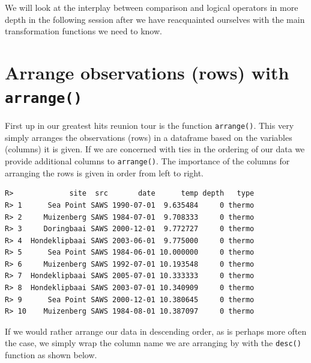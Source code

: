 \documentclass[]{book}
\newenvironment{Shaded}{\begin{snugshade}}{\end{snugshade}}
\newcommand{\KeywordTok}[1]{\textcolor[rgb]{0.13,0.29,0.53}{\textbf{#1}}}
\newcommand{\StringTok}[1]{\textcolor[rgb]{0.31,0.60,0.02}{#1}}
\newcommand{\OperatorTok}[1]{\textcolor[rgb]{0.81,0.36,0.00}{\textbf{#1}}}
\newcommand{\NormalTok}[1]{#1}
\theoremstyle{definition}
\theoremstyle{definition}
\theoremstyle{definition}
\theoremstyle{remark}
\begin{document}
We will look at the interplay between comparison and logical operators
in more depth in the following session after we have reacquainted
ourselves with the main transformation functions we need to know.

\section{\texorpdfstring{Arrange observations (rows) with
\texttt{arrange()}}{Arrange observations (rows) with arrange()}}\label{arrange-observations-rows-with-arrange}

First up in our greatest hits reunion tour is the function
\texttt{arrange()}. This very simply arranges the observations (rows) in
a dataframe based on the variables (columns) it is given. If we are
concerned with ties in the ordering of our data we provide additional
columns to \texttt{arrange()}. The importance of the columns for
arranging the rows is given in order from left to right.

\begin{Shaded}
\end{Shaded}

\begin{verbatim}
R>             site  src       date      temp depth   type
R> 1      Sea Point SAWS 1990-07-01  9.635484     0 thermo
R> 2     Muizenberg SAWS 1984-07-01  9.708333     0 thermo
R> 3     Doringbaai SAWS 2000-12-01  9.772727     0 thermo
R> 4  Hondeklipbaai SAWS 2003-06-01  9.775000     0 thermo
R> 5      Sea Point SAWS 1984-06-01 10.000000     0 thermo
R> 6     Muizenberg SAWS 1992-07-01 10.193548     0 thermo
R> 7  Hondeklipbaai SAWS 2005-07-01 10.333333     0 thermo
R> 8  Hondeklipbaai SAWS 2003-07-01 10.340909     0 thermo
R> 9      Sea Point SAWS 2000-12-01 10.380645     0 thermo
R> 10    Muizenberg SAWS 1984-08-01 10.387097     0 thermo
\end{verbatim}

If we would rather arrange our data in descending order, as is perhaps
more often the case, we simply wrap the column name we are arranging by
with the \texttt{desc()} function as shown below.

\begin{Shaded}
\end{Shaded}
\end{document}
